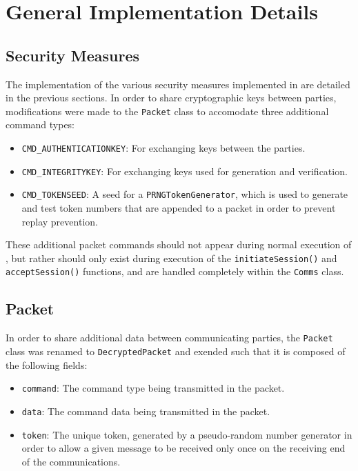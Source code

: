 \documentclass[a4paper,11pt]{article}
\begin{document}
\section{General Implementation Details}

\subsection{Security Measures}
The implementation of the various security measures implemented in 
\packageName{} are detailed in the previous sections. In order to share
cryptographic keys between parties, modifications were made to the 
\packageName{} \verb+Packet+ class to accomodate three additional command types:
\begin{itemize}
\item \verb+CMD_AUTHENTICATIONKEY+: For exchanging  
keys between the parties.
\item \verb+CMD_INTEGRITYKEY+: For exchanging  keys used for
 generation and 
verification.
\item \verb+CMD_TOKENSEED+: A seed for a \verb+PRNGTokenGenerator+, 
which is used to generate and test token numbers that are appended to a packet
in order to prevent replay prevention.
\end{itemize}

These additional packet commands should not appear during normal execution of 
\serviceName{}, but rather should only exist during execution of the
\verb+initiateSession()+ and \verb+acceptSession()+ functions, and are handled 
completely within the \verb+Comms+ class.

\subsection{Packet}
In order to share additional data between communicating parties, the 
\serviceName{} \verb+Packet+ class was renamed to \verb+DecryptedPacket+ and 
exended such that it is composed of the following fields:
\begin{itemize}
\item \verb+command+: The command type being transmitted in the 
packet.
\item \verb+data+: The command data being transmitted in the packet.
\item \verb+token+: The unique token, generated by a pseudo-random
number generator in order to allow a given message to be received only once on 
the receiving end of the communications.
\end{itemize}
\end{document}
